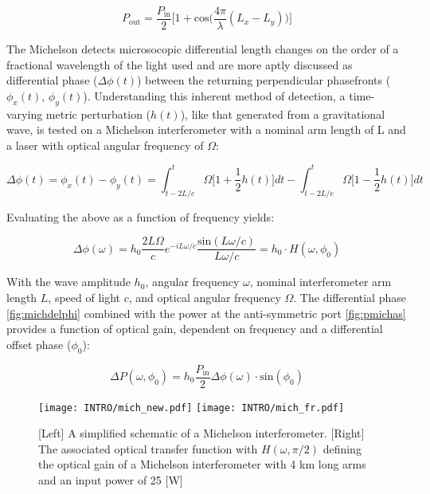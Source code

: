 \begin{equation}\label{fig:pmichas}
	P_\mathrm{out} = \frac{P_\mathrm{in}}{2} \bigg[1+\mathrm{cos}\Big(\frac{4\pi}{\lambda} (L_x - L_y)\Big) \bigg]
\end{equation}

The Michelson detects microsocopic differential length changes on the order of a fractional wavelength of the light used and are more aptly discussed as differential phase ($\Delta \phi(t)$) between the returning perpendicular phasefronts ($\phi_x(t)$, $\phi_y(t)$). Understanding this inherent method of detection, a time-varying metric perturbation ($h(t)$), like that generated from a gravitational wave, is tested on a Michelson interferometer with a nominal arm length of L and a laser with optical angular frequency of $\Omega$:

\begin{equation}
\Delta \phi(t) = \phi_x(t) - \phi_y(t) =  \int_{t-2L/c}^{t} \Omega \bigg[1 + \frac{1}{2}h(t)\bigg]dt - \int_{t-2L/c}^{t} \Omega \bigg[1 - \frac{1}{2}h(t)\bigg]dt 
\end{equation}

\noindent Evaluating the above as a function of frequency yields:

\begin{equation}\label{fig:michdelphi}
	\Delta \phi (\omega) = h_0\frac{2 L \Omega}{c}e^{-i L \omega / c} \frac{\mathrm{sin}(L \omega /c)}{L \omega /c} = h_0 \cdot H(\omega, \phi_0)
\end{equation}

With the wave amplitude $h_0$, angular frequency $\omega$, nominal interferometer arm length $L$, speed of light $c$, and optical angular frequency $\Omega$.
The differential phase \autoref{fig:michdelphi} combined with the power at the anti-symmetric port \autoref{fig:pmichas} provides a function of optical gain, dependent on frequency and a differential offset phase ($\phi_0$):

\begin{equation}
	\Delta P(\omega, \phi_0) = h_0 \frac{P_\mathrm{in}}{2} \Delta \phi (\omega) \cdot \mathrm{sin}(\phi_0)
\end{equation}

\begin{figure}[ht!]
	\begin{subcaptiongroup}
		\texttt{[image: INTRO/mich\_new.pdf]}
		\texttt{[image: INTRO/mich\_fr.pdf]}
 	\end{subcaptiongroup}
  	\hfill
	\caption{[Left] A simplified schematic of a Michelson interferometer. [Right] The associated optical transfer function with $H(\omega, \pi/2)$ defining the optical gain of a Michelson interferometer with 4 km long arms and an input power of 25 [W]}
		\label{fig:mich}
\end{figure}
\FloatBarrier

